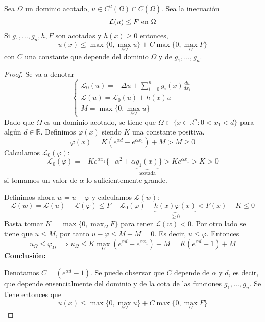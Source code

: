\newpage
\begin{theorem}
Sea $\Omega$ un dominio acotado, $u\in C^2(\Omega)\cap C(\overline{\Omega})$. 
Sea la inecuación
$$\mathcal{L}(u) \le F  \text{ en } \Omega\\$$
Si $g_1,\hdots,g_n,h,F$ son acotadas y $h(x) \ge 0$ entonces,
$$u(x) \le \max\{0, \max_{\delta\Omega}u\} + C\max\{0, \max_{\Omega} F\}$$
con $C$ una constante que depende del dominio $\Omega$ y de $g_1,\hdots,g_n$.
\end{theorem}
\begin{proof}
Se va a denotar
\begin{equation*}
\left\{
\begin{array}{l}
\mathcal{L}_0(u)=-\Delta u+\sum_{i=0}^ng_i(x)\frac{du}{dx_i}\\
\mathcal{L}(u) = \mathcal{L}_0(u)+h(x)u\\
M=\max\{0,\max_{\delta\Omega}u\}
\end{array}
\right.
\end{equation*}
Dado que $\Omega$ es un dominio acotado, se tiene que
$\Omega\subset\{x\in\mathbb{R}^n: 0<x_1<d\}$ para algún $d\in\mathbb{R}$.
Definimos $\varphi(x)$ siendo $K$ una constante positiva.
$$\varphi(x)=K\left(e^{\alpha d}-e^{\alpha x_1}\right)+M > M \ge 0$$
Calculamos $\mathcal{L}_0(\varphi)$:
$$\mathcal{L}_0(\varphi)=-Ke^{\alpha x_1}\{-\alpha^2+\alpha \underbrace{g_1(x)}_{\text{acotada}}\}>Ke^{\alpha x_1} > K > 0$$
si tomamos un valor de $\alpha$ lo suficientemente grande.

\noindent Definimos ahora $w=u-\varphi$ y calculamos $\mathcal{L}(w)$:
$$\mathcal{L}(w) = \mathcal{L}(u)-\mathcal{L}(\varphi) \le F - \mathcal{L}_0(\varphi)-\underbrace{h(x)\varphi(x)}_{\ge0}<F(x)-K \le 0$$
Basta tomar $K=\max\{0, \max_{\Omega}F\}$ para tener $\mathcal{L}(w) < 0$.
Por otro lado se tiene que $u\le M$, por tanto $u-\varphi\le M - M = 0$. Es decir, $u \le \varphi$. Entonces 
$$u_\Omega \le \varphi_\Omega\implies u_\Omega \le K\max_\Omega\left(e^{\alpha d}-e^{\alpha x_1}\right) + M = K\left(e^{\alpha d}-1\right) + M$$
\textbf{Conclusión:}

Denotamos $C = \left(e^{\alpha d}-1\right)$. Se puede observar que $C$ depende de $\alpha$ y $d$, es decir, que depende ensencialmente del dominio y de la cota de las funciones $g_1,\hdots,g_n$.
Se tiene entonces que 
$$u(x) \le \max\{0, \max_{\delta\Omega}u\} + C\max\{0, \max_{\Omega} F\}$$
\end{proof}